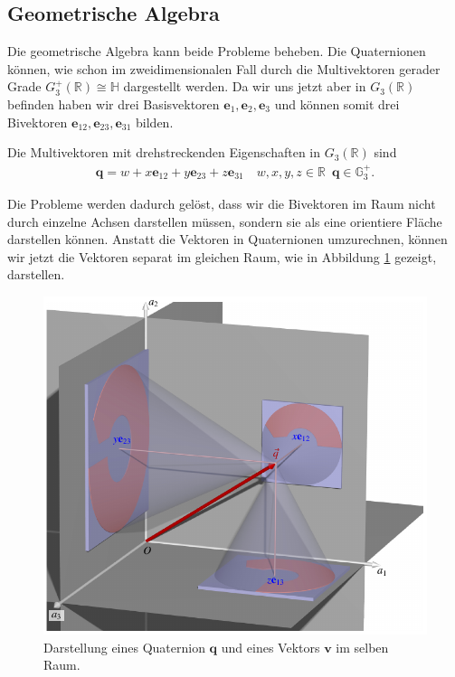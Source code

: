 \subsection{Geometrische Algebra}
Die geometrische Algebra kann beide Probleme beheben.
Die Quaternionen können, wie schon im zweidimensionalen Fall durch die Multivektoren gerader Grade $G_3^+(\mathbb{R}) \cong \mathbb{H}$ dargestellt werden.
Da wir uns jetzt aber in $G_3(\mathbb{R})$ befinden haben wir drei Basisvektoren $\mathbf{e}_1, \mathbf{e}_2, \mathbf{e}_3$ und können somit drei Bivektoren $\mathbf{e}_{12}, \mathbf{e}_{23}, \mathbf{e}_{31}$ bilden.
\begin{definition}
	Die Multivektoren mit drehstreckenden Eigenschaften in $G_3(\mathbb{R})$ sind
	\begin{align*}
	\mathbf{q} = w + x\mathbf{e}_{12} + y\mathbf{e}_{23} + z\mathbf{e}_{31} \quad w,x,y,z \in \mathbb{R}\enspace \mathbf{q} \in \mathbb{G}_3^+.
	\end{align*}
\end{definition}

Die Probleme werden dadurch gelöst, dass wir die Bivektoren im Raum nicht durch einzelne Achsen darstellen müssen, sondern sie als eine orientiere Fläche darstellen können.
Anstatt die Vektoren in Quaternionen umzurechnen, können wir jetzt die Vektoren separat im gleichen Raum, wie in Abbildung \ref{BildQuaternionen} gezeigt, darstellen.
\begin{figure}
	\centering
	\includegraphics{papers/clifford/3d/dq.pdf}
	\caption{Darstellung eines Quaternion $\mathbf{q}$ und eines Vektors $\mathbf{v}$ im selben Raum.}
	\label{BildQuaternionen}
\end{figure}


